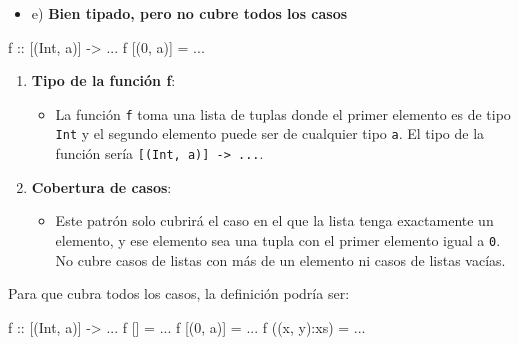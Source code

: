\documentclass{article}
\begin{document}
    \begin{itemize}
        \item 
        e) \textbf{Bien tipado, pero no cubre todos los casos}
        \end{itemize}
    \begin{haskell}
    f :: [(Int, a)] -> ...
    f [(0, a)] = ...
    \end{haskell}
        \begin{enumerate}
        \item 
        \textbf{Tipo de la función f}:
        \begin{itemize}
        \item 
        La función \verb|f| toma una lista de tuplas donde el primer elemento es de tipo \verb|Int| y el segundo elemento puede ser de cualquier tipo \verb|a|. El tipo de la función sería \verb|[(Int, a)] -> ...|.
        \end{itemize}
        \item 
        \textbf{Cobertura de casos}:
        \begin{itemize}
        \item 
        Este patrón solo cubrirá el caso en el que la lista tenga exactamente un elemento, y ese elemento sea una tupla con el primer elemento igual a \verb|0|. No cubre casos de listas con más de un elemento ni casos de listas vacías.
        \end{itemize}
        \end{enumerate}
        
        Para que cubra todos los casos, la definición podría ser:
    \begin{haskell}
    f :: [(Int, a)] -> ...
    f [] = ...                 
    f [(0, a)] = ...           
    f ((x, y):xs) = ...        
    \end{haskell}
        
\end{document}
